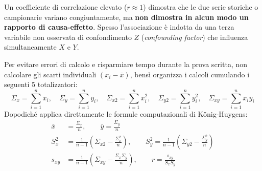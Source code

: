 \begin{esame}
Un coefficiente di correlazione elevato ($r \approx 1$) dimostra che le due serie storiche o campionarie variano congiuntamente, ma \textbf{non dimostra in alcun modo un rapporto di causa-effetto}. Spesso l'associazione è indotta da una terza variabile non osservata di confondimento $Z$ (\emph{confounding factor}) che influenza simultaneamente $X$ e $Y$.
\end{esame}

\begin{metodo}
Per evitare errori di calcolo e risparmiare tempo durante la prova scritta, non calcolare gli scarti individuali $(x_i - \overline{x})$, bensì organizza i calcoli cumulando i seguenti 5 totalizzatori:
\begin{equation}
\Sigma_x = \sum_{i=1}^n x_i, \quad \Sigma_y = \sum_{i=1}^n y_i, \quad \Sigma_{x2} = \sum_{i=1}^n x_i^2, \quad \Sigma_{y2} = \sum_{i=1}^n y_i^2, \quad \Sigma_{xy} = \sum_{i=1}^n x_i y_i
\end{equation}
Dopodiché applica direttamente le formule computazionali di König-Huygens:
\begin{align}
\overline{x} &= \frac{\Sigma_x}{n}, \qquad \overline{y} = \frac{\Sigma_y}{n} \\
S_x^2 &= \frac{1}{n-1}\left(\Sigma_{x2} - \frac{\Sigma_x^2}{n}\right), \qquad S_y^2 = \frac{1}{n-1}\left(\Sigma_{y2} - \frac{\Sigma_y^2}{n}\right) \\
s_{xy} &= \frac{1}{n-1}\left(\Sigma_{xy} - \frac{\Sigma_x \Sigma_y}{n}\right), \qquad r = \frac{s_{xy}}{S_x S_y}
\end{align}
\end{metodo}
